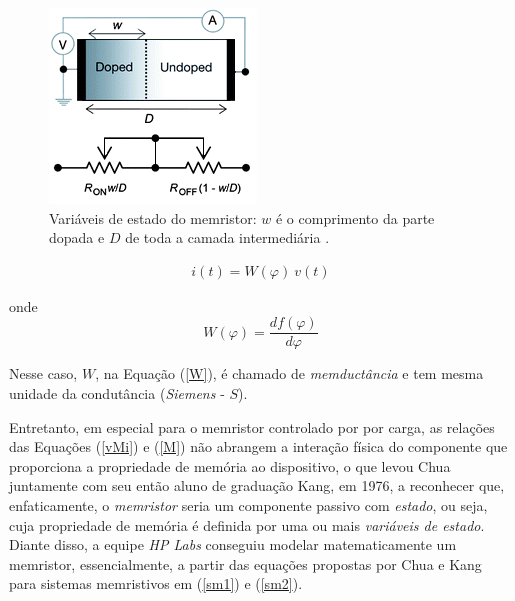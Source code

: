\documentclass{ceel}
\begin{document}
\begin{multicols}{2}
\begin{figure}[H]
\centering
\includegraphics[width=0.7\columnwidth]{new-w}
\caption{Variáveis de estado do memristor: $w$ é o comprimento da parte dopada e $D$ de toda a camada intermediária \cite{image}.}\label{w}
\end{figure}

\vspace{-0.2cm}
\begin{gather}\label{iWv}
i(t)=W(\varphi)\ v(t)
\end{gather}

\noindent onde
\begin{equation} \label{W}
W(\varphi) =\dfrac{df(\varphi)}{d\varphi}
\end{equation}
\vspace{0.05cm}

Nesse caso, $W$, na Equação (\ref{W}), é chamado de \textit{memductância} e tem mesma unidade da condutância (\textit{Siemens} - $S$).

Entretanto, em especial para o memristor controlado por por carga, as relações das Equações (\ref{vMi}) e (\ref{M}) não abrangem a interação física do componente que proporciona a propriedade de memória ao dispositivo, o que levou Chua juntamente com seu então aluno de graduação Kang, em 1976, a reconhecer que, enfaticamente, o \emph{memristor} seria um componente passivo com \emph{estado}, ou seja, cuja propriedade de memória é definida por uma ou mais \emph{variáveis de estado}.
Diante disso, a equipe \emph{HP Labs} conseguiu modelar matematicamente um memristor, essencialmente, a partir das equações propostas por Chua e Kang \cite{1976} para sistemas memristivos em (\ref{sm1}) e (\ref{sm2}).


\end{multicols}
\end{document}
